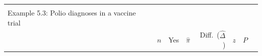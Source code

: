 \documentclass[11pt,a4paper,openany]{book}
\begin{document}
\begin{longtable}[]{@{}lrrrrrrr@{}}
\begin{minipage}[t]{0.07\columnwidth}
\strut
\end{minipage}\tabularnewline
\begin{minipage}[t]{0.35\columnwidth}\raggedright\strut
Example 5.3: Polio diagnoses in a vaccine trial\strut
\end{minipage} & \begin{minipage}[t]{0.05\columnwidth}\raggedleft\strut
\strut
\end{minipage} & \begin{minipage}[t]{0.04\columnwidth}\raggedleft\strut
\strut
\end{minipage} & \begin{minipage}[t]{0.06\columnwidth}\raggedleft\strut
\strut
\end{minipage} & \begin{minipage}[t]{0.11\columnwidth}\raggedleft\strut
\strut
\end{minipage} & \begin{minipage}[t]{0.05\columnwidth}\raggedleft\strut
\strut
\end{minipage} & \begin{minipage}[t]{0.05\columnwidth}\raggedleft\strut
\strut
\end{minipage} & \begin{minipage}[t]{0.07\columnwidth}\raggedleft\strut
\strut
\end{minipage}\tabularnewline
\begin{minipage}[t]{0.35\columnwidth}\raggedright\strut
\strut
\end{minipage} & \begin{minipage}[t]{0.05\columnwidth}\raggedleft\strut
\(n\)\strut
\end{minipage} & \begin{minipage}[t]{0.04\columnwidth}\raggedleft\strut
Yes\strut
\end{minipage} & \begin{minipage}[t]{0.06\columnwidth}\raggedleft\strut
\(\hat{\pi}\)\strut
\end{minipage} & \begin{minipage}[t]{0.11\columnwidth}\raggedleft\strut
Diff.~(\(\hat{\Delta}\))\strut
\end{minipage} & \begin{minipage}[t]{0.05\columnwidth}\raggedleft\strut
\(z\)\strut
\end{minipage} & \begin{minipage}[t]{0.05\columnwidth}\raggedleft\strut
\(P\)\strut
\end{minipage} & \begin{minipage}[t]{0.07\columnwidth}\raggedleft\strut

\end{minipage}
\end{longtable}
\end{document}
